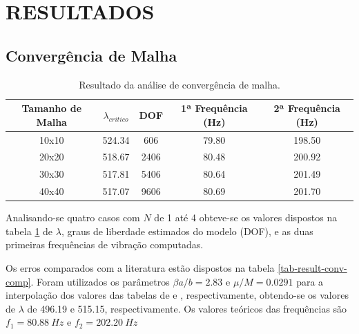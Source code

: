 \section{RESULTADOS}

\subsection{Convergência de Malha}

\begin{table}[H]
\centering
\caption{Resultado da análise de convergência de malha.}
\begin{tabular}{|c|c|c|c|c|} 
\hline
Tamanho de Malha & $\lambda_{critico}$ & DOF  & 1ª Frequência (\si{Hz}) & 2ª Frequência (\si{Hz}) \\ \hline
10x10            & \num{524,34}    & \num{606}  & \num{79,80}         & \num{198,50}        \\ \hline
20x20            & \num{518,67}    & \num{2406} & \num{80,48}         & \num{200,92}        \\ \hline
30x30            & \num{517,81}    & \num{5406} & \num{80,64}         & \num{201,49}        \\ \hline
40x40            & \num{517,07}    & \num{9606} & \num{80,69}         & \num{201,70}        \\ \hline
\end{tabular}
\label{tab-result-conv}   
\end{table}

Analisando-se quatro casos com $N$ de 1 até 4 obteve-se os valores
dispostos na tabela \ref{tab-result-conv} de $\lambda$, graus de
liberdade estimados do modelo (DOF), e as duas primeiras frequências
de vibração computadas.


Os erros comparados com a literatura estão dispostos na tabela 
\ref{tab-result-conv-comp}.
Foram utilizados os parâmetros $\beta a/b = \num{2,83}$ e $\mu/M = 
\num{0,0291}$ para a interpolação dos valores das tabelas de
\cite{hedgepeth_flutter_1957} e \cite{pegado_metodo_2003}, 
respectivamente, obtendo-se os valores de $\lambda$ de \num{496,19} e 
\num{515,15}, respectivamente. Os valores teóricos das frequências são
$f_1 = \SI{80.88}{Hz}$ e $f_2 = \SI{202.20}{Hz}$

